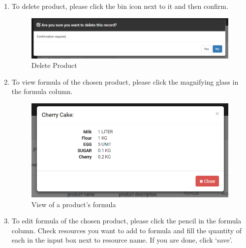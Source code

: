 \documentclass[a4paper,11pt,twoside]{report}
\theoremstyle{definition}
\begin{document}
\begin{enumerate}
\begin{enumerate}
\item To delete product, please click the bin icon next to it and then confirm.


\begin{figure}[h!]
\begin{center}
\includegraphics[width=\textwidth]{AS/product/7}
\end{center}
\caption{Delete Product}
\end{figure}
\thispagestyle{empty}

\item To view formula of the chosen product, please click the magnifying glass in the formula column.

\begin{figure}[h!]
\begin{center}
\includegraphics[width=\textwidth]{AS/product/2}
\end{center}
\caption{View of a product's formula}
\end{figure}
\thispagestyle{empty}

\item To edit formula of the chosen product, please click the pencil in the formula column. Check resources you want to add to formula and fill the quantity of each in the input box next to resource name. If you are done, click ‘save’.



\end{enumerate}
\end{enumerate}
\end{document}
